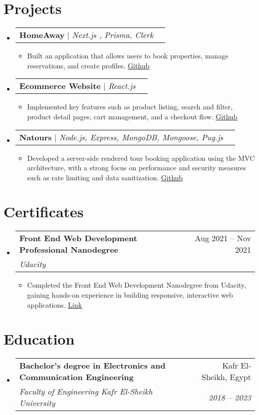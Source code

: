 \documentclass[letterpaper,11pt]{article}
\makeatletter
\newcommand{\resumeItem}[1]{
  \item\small{
    {#1 \vspace{-2pt}}
  }
}
\newcommand{\resumeSubheading}[4]{
  \vspace{-2pt}\item
    \begin{tabular*}{0.97\textwidth}[t]{l@{\extracolsep{\fill}}r}
      \textbf{#1} & #2 \\
      \textit{\small#3} & \textit{\small #4} \\
    \end{tabular*}\vspace{-7pt}
}
\newcommand{\resumeProjectHeading}[2]{
    \item
    \begin{tabular*}{0.97\textwidth}{l@{\extracolsep{\fill}}r}
      \small#1 & #2 \\
    \end{tabular*}\vspace{-7pt}
}
\newcommand{\resumeSubHeadingListStart}{\begin{itemize}[leftmargin=0.15in, label={}]}
\newcommand{\resumeSubHeadingListEnd}{\end{itemize}}
\newcommand{\resumeItemListStart}{\begin{itemize}}
\newcommand{\resumeItemListEnd}{\end{itemize}\vspace{-5pt}}
\makeatother
\begin{document}
\section{Projects}
    \resumeSubHeadingListStart
      \resumeProjectHeading
          {\textbf{HomeAway} $|$ \emph{Next.js , Prisma, Clerk}}{}
          \resumeItemListStart
            \resumeItem{Built an application that allows users to book properties, manage reservations, and 
create profiles. \href{https://github.com/mohamedrehan1/home-away}{\underline{Github}}}
          \resumeItemListEnd
          
      \resumeProjectHeading
          {\textbf{Ecommerce Website } $|$ \emph{React.js}}{}
          \resumeItemListStart
            \resumeItem{Implemented key features such as product listing, search and filter, product detail pages, cart management, and a checkout flow. \href{https://github.com/mohamedrehan1/Ecommerce-Website}{\underline{Github}}}
          \resumeItemListEnd

          \resumeProjectHeading
          {\textbf{Natours} $|$ \emph{Node.js, Express, MongoDB, Mongoose, Pug.js}}{}
          \resumeItemListStart
            \resumeItem{Developed a server-side rendered tour booking application using the MVC architecture, with a strong focus on performance and security measures such as rate limiting and data sanitization. \href{https://github.com/mohamedrehan1/natours}{\underline{Github}}}
          \resumeItemListEnd
    \resumeSubHeadingListEnd

\section{Certificates}
    \resumeSubHeadingListStart    
        \resumeSubheading
      {Front End Web Development Professional Nanodegree}{Aug 2021 -- Nov 2021}
      {Udacity}{}
      \resumeItemListStart
        \resumeItem{Completed the Front End Web Development Nanodegree from Udacity, gaining hands-on experience in building responsive, interactive web applications. \href{https://www.udacity.com/certificate/XLTGAKSF}{\underline{Link}}}

      \resumeItemListEnd

    \resumeSubHeadingListEnd


\section{Education}
  \resumeSubHeadingListStart
    \resumeSubheading
      {Bachelor's degree in Electronics and Communication Engineering}{Kafr El-Sheikh, Egypt}
      {Faculty of Engineering Kafr El-Sheikh University}{2018 -- 2023}
  \resumeSubHeadingListEnd
\end{document}
